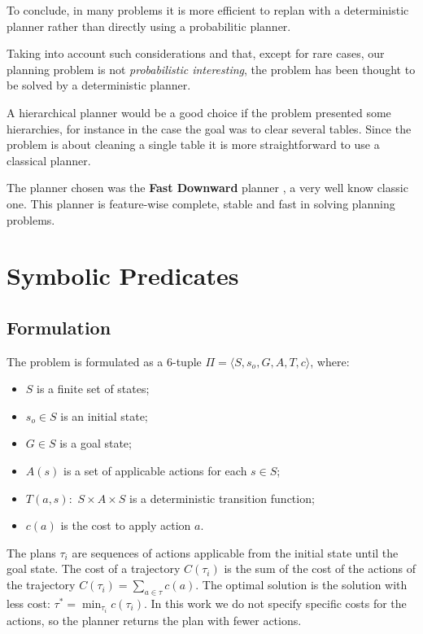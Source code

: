 To conclude, in many problems it is more efficient to replan with a deterministic planner rather than directly using a probabilitic planner. 


Taking into account such considerations and that, except for rare cases, our planning problem is not \textit{probabilistic interesting}, the problem has been thought to be solved by a deterministic planner.

A hierarchical planner would be a good choice if the problem presented some hierarchies, for instance in the case the goal was to clear several tables. Since the problem is about cleaning a single table it is more straightforward to use a classical planner.

The planner chosen was the \textbf{Fast Downward} planner \citep{helmert2006fast}, a very well know classic one. 
This planner is feature-wise complete, stable and fast in solving planning problems.

\section{Symbolic Predicates}

\subsection{Formulation}
The problem is formulated as a $6$-tuple $\Pi=\langle S, s_o, G, A, T, c \rangle$, where:
\begin{itemize}
\item $S$ is a finite set of states;
\item $s_o \in S$ is an initial state;
\item $G \in S$ is a goal state;
\item $A(s)$ is a set of applicable actions for each $s \in S$;
\item $T(a,s) :$ $ S \times A \times S$ is a deterministic transition function;
\item $c(a)$ is the cost to apply action $a$.
\end{itemize}
The plans $\tau_i$ are sequences of actions applicable from the initial state until the goal state. The cost of a trajectory $C(\tau_i)$ is the sum of the cost of the actions of the trajectory $C(\tau_i) = \sum_{a \in \tau} c(a)$. The optimal solution is the solution with less cost: $\tau^* = \min_{\tau_i} c(\tau_i)$.
In this work we do not specify specific costs for the actions, so the planner returns the plan with fewer actions.



